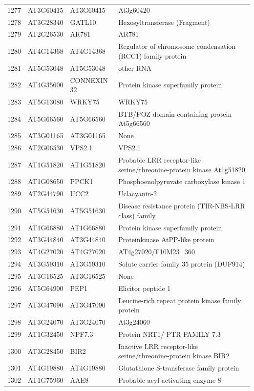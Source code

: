 \documentclass[11pt]{article}
\begin{document}
\begin{center}
\begin{tabular}{rlll}
1277 & AT3G60415 & AT3G60415 & At3g60420\\
1278 & AT3G28340 & GATL10 & Hexosyltransferase (Fragment)\\
1279 & AT2G26530 & AR781 & AR781\\
1280 & AT4G14368 & AT4G14368 & Regulator of chromosome condensation (RCC1) family protein\\
1281 & AT5G53048 & AT5G53048 & other RNA\\
1282 & AT4G35600 & CONNEXIN 32 & Protein kinase superfamily protein\\
1283 & AT5G13080 & WRKY75 & WRKY75\\
1284 & AT5G66560 & AT5G66560 & BTB/POZ domain-containing protein At5g66560\\
1285 & AT3G01165 & AT3G01165 & None\\
1286 & AT2G06530 & VPS2.1 & VPS2.1\\
1287 & AT1G51820 & AT1G51820 & Probable LRR receptor-like serine/threonine-protein kinase At1g51820\\
1288 & AT1G08650 & PPCK1 & Phosphoenolpyruvate carboxylase kinase 1\\
1289 & AT2G44790 & UCC2 & Uclacyanin-2\\
1290 & AT5G51630 & AT5G51630 & Disease resistance protein (TIR-NBS-LRR class) family\\
1291 & AT1G66880 & AT1G66880 & Protein kinase superfamily protein\\
1292 & AT3G44840 & AT3G44840 & Proteinkinase AtPP-like protein\\
1293 & AT4G27020 & AT4G27020 & AT4g27020/F10M23\_360\\
1294 & AT3G59310 & AT3G59310 & Solute carrier family 35 protein (DUF914)\\
1295 & AT3G16525 & AT3G16525 & None\\
1296 & AT5G64900 & PEP1 & Elicitor peptide 1\\
1297 & AT3G47090 & AT3G47090 & Leucine-rich repeat protein kinase family protein\\
1298 & AT3G24070 & AT3G24070 & At3g24060\\
1299 & AT1G32450 & NPF7.3 & Protein NRT1/ PTR FAMILY 7.3\\
1300 & AT3G28450 & BIR2 & Inactive LRR receptor-like serine/threonine-protein kinase BIR2\\
1301 & AT4G19880 & AT4G19880 & Glutathione S-transferase family protein\\
1302 & AT1G75960 & AAE8 & Probable acyl-activating enzyme 8\\

\end{tabular}
\end{center}
\end{document}
